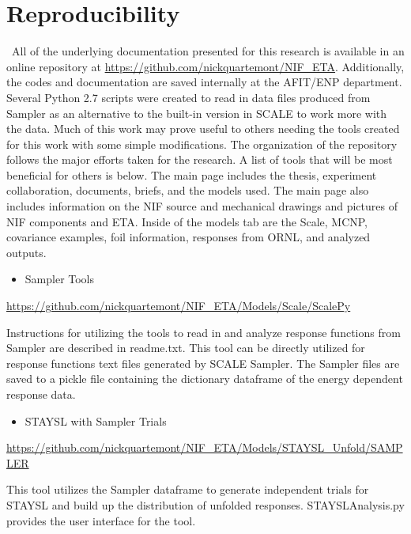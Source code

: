 \chapter{Reproducibility}

\ All of the underlying documentation presented for this research is available in an online repository at \url{https://github.com/nickquartemont/NIF_ETA}. 
Additionally, the codes and documentation are saved internally at the AFIT/ENP department. 
Several Python 2.7 scripts were created to read in data files produced from Sampler as an alternative to the built-in version in SCALE to work more with the data. 
Much of this work may prove useful to others needing the tools created for this work with some simple modifications.
The organization of the repository follows the major efforts taken for the research. A list of tools that will be most beneficial for others is below. The main page includes the thesis, experiment collaboration, documents, briefs, and the models used. 
The main page also includes information on the NIF source and mechanical drawings and pictures of NIF components and ETA. 
Inside of the models tab are the Scale, MCNP, covariance examples, foil information, responses from ORNL, and analyzed outputs. 


\begin{itemize}
	\item Sampler Tools 
\end{itemize}
\begin{sloppypar}	
\url{https://github.com/nickquartemont/NIF_ETA/Models/Scale/ScalePy}
\end{sloppypar}

Instructions for utilizing the tools to read in and analyze response functions from Sampler are described in readme.txt. 
This tool can be directly utilized for response functions text files generated by SCALE Sampler. 
The Sampler files are saved to a pickle file containing the dictionary dataframe of the energy dependent response data. 
	
\begin{itemize}
	\item STAYSL with Sampler Trials  
\end{itemize}

\begin{sloppypar}	
\noindent \url{https://github.com/nickquartemont/NIF_ETA/Models/STAYSL_Unfold/SAMPLER}
\end{sloppypar}	
	
This tool utilizes the Sampler dataframe to generate independent trials for STAYSL and build up the distribution of unfolded responses. 
STAYSL\textunderscore Analysis.py provides the user interface for the tool. 

